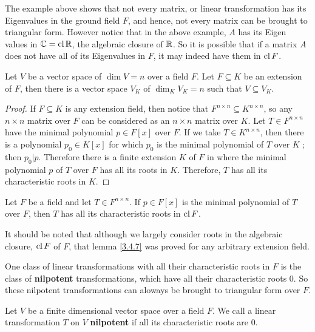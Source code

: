 The example above shows that not every matrix, or linear transformation has its
Eigenvalues in the ground field $F$, and hence, not every matrix can be brought
to triangular form. However notice that in the above example, $A$ has its Eigen
values in  $\mathbb{C}=\operatorname{cl}{\mathbb{R}}$, the algebraic closure of $\mathbb{R}$. So it is possible that
if a matrix $A$ does not have all of its Eigenvalues in  $F$, it may indeed
have them in $\operatorname{cl}{F}$.

\begin{lemma}\label{3.4.7}
    Let $V$ be a vector space of $\dim{V}=n$ over a field $F$. Let  $F
    \subseteq K$ be an extension of $F$, then there is a vector space $V_K$ of
     $\dim_K{V_K}=n$ such that $V \subseteq V_K$.
\end{lemma}
\begin{proof}
    If $F \subseteq K$ is any extension field, then notice that  $F^{n \times
    n} \subseteq K^{n \times n}$, so any $n \times n$ matrix over  $F$ can be
    considered as an  $n \times n$ matrix over  $K$. Let  $T \in F^{n \times
    n}$ have the minimal polynomial $p \in F[x]$ over $F$. If we take $T \in
    K^{n \times n}$, then there is a polynomial $p_0 \in K[x]$ for which $p_0$
    is the minimal polynomial of $T$ over  $K$ ; then $p_0|p$. Therefore there
    is a finite extension $K$ of  $F$ in where the minimal polynomial  $p$ of
    $T$ over  $F$ has all its roots in  $K$. Therefore, $T$ has all its
    characteristic roots in  $K$.
\end{proof}
\begin{corollary}
    Let $F$ be a field and let  $T \in F^{n \times n}$. If $p \in F[x]$ is the
    minimal polynomial of $T$ over $F$, then $T$ has all its characteristic
    roots in  $\operatorname{cl}{F}$.
\end{corollary}
\begin{remark}
    It should be noted that although we largely consider roots in the algebraic
    closure, $\operatorname{cl}{F}$ of $F$, that lemma \ref{3.4.7} was proved for any
    arbitrary extension field.
\end{remark}

One class of linear transformations with all their characteristic roots in $F$
is the class of  \textbf{nilpotent} transformations, which have all their
characteristic roots $0$. So these nilpotent transformations can aloways be
brought to triangular form over  $F$.

\begin{definition}
    Let $V$ be a finite dimensional vector space over a field  $F$. We call a
    linear transformation  $T$ on  $V$ \textbf{nilpotent} if all its
    characteristic roots are $0$.
\end{definition}

